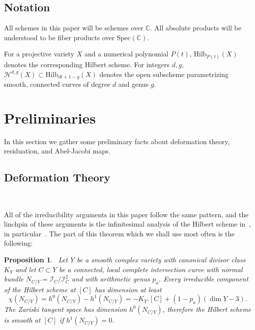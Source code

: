 \documentclass[twoside,12pt,reqno]{amsart}
\theoremstyle{plain}
\newtheorem{prop}[thm]{Proposition}
\theoremstyle{definition}
\newcommand{\Hdg}[2]{\mathcal{H}^{#1,#2}}
\newcommand{\CC}{\mathbb{C}}
\newcommand{\HI}[2]{\text{Hilb}_{#1}(#2)}
\def\ps{\vspace{4pt}}
\begin{document}
\subsection{Notation} \label{sec-not}

All schemes in this paper will be schemes over $\CC$.  All absolute
products will be understood to be fiber products over
$\text{Spec}(\CC)$.

\ps

For a projective variety $X$ and a numerical polynomial $P(t)$,
$\HI{P(t)}{X}$ denotes the corresponding Hilbert scheme.  For integers
$d,g$, $\Hdg{d}{g}(X)\subset \HI{dt+1-g}{X}$ denotes the open
subscheme parametrizing smooth, connected curves of degree $d$ and
genus $g$.

\section{Preliminaries}

In this section we gather some preliminary facts about deformation
theory, residuation, and Abel-Jacobi maps.

\ps


\subsection{Deformation Theory}~\label{sec-def}

All of the irreducibility arguments in this paper follow the same
pattern, and the linchpin of these arguments is the infinitesimal
analysis of the Hilbert scheme in~\cite[section I.2]{K}, in
particular~\cite[theorem I.2.15]{K}.  The part of this theorem which 
we shall use most often is the following:

\ps

\begin{prop}~\label{prop-def1}  
Let $Y$ be a smooth complex variety
with canonical 
divisor class $K_Y$ and let $C\subset Y$ be a connected, local complete
intersection curve with normal bundle $N_{C/Y} =
\mathcal{I}_C/\mathcal{I}_C^2$ and with arithmetic genus $p_a$.   
Every irreducible component of the Hilbert scheme 
at $[C]$ has dimension at least
\begin{equation}
\chi(N_{C/Y}) = h^0(N_{C/Y})-h^1(N_{C/Y}) = -K_Y.[C] +
(1-p_a)(\dim Y - 3). 
\end{equation}
The Zariski tangent space has dimension $h^0(N_{C/Y})$, therefore the
Hilbert scheme is smooth at $[C]$ if $h^1(N_{C/Y})=0$.
\end{prop}
\end{document}
